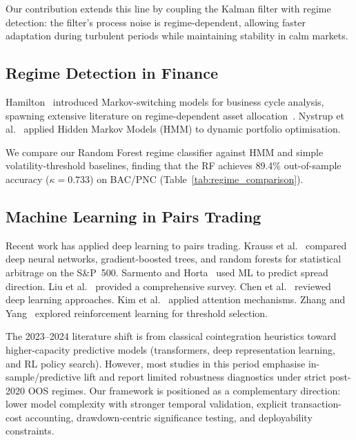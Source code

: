 \documentclass{ieeeaccess}
\begin{document}
Our contribution extends this line by coupling the Kalman filter with regime detection: the filter's process noise is regime-dependent, allowing faster adaptation during turbulent periods while maintaining stability in calm markets.

\subsection{Regime Detection in Finance}

Hamilton~\cite{hamilton1989new} introduced Markov-switching models for business cycle analysis, spawning extensive literature on regime-dependent asset allocation~\cite{ang2012regime, guidolin2011markov, bulla2011markov}.
Nystrup et al.~\cite{nystrup2017dynamic} applied Hidden Markov Models (HMM) to dynamic portfolio optimisation.

We compare our Random Forest regime classifier against HMM and simple volatility-threshold baselines, finding that the RF achieves 89.4\% out-of-sample accuracy ($\kappa = 0.733$) on BAC/PNC (Table~\ref{tab:regime_comparison}).

\subsection{Machine Learning in Pairs Trading}

Recent work has applied deep learning to pairs trading.
Krauss et al.~\cite{krauss2017deep} compared deep neural networks, gradient-boosted trees, and random forests for statistical arbitrage on the S\&P~500.
Sarmento and Horta~\cite{sarmento2020enhancing} used ML to predict spread direction.
Liu et al.~\cite{liu2023pairs} provided a comprehensive survey.
Chen et al.~\cite{chen2023deep} reviewed deep learning approaches.
Kim et al.~\cite{kim2023transformer} applied attention mechanisms.
Zhang and Yang~\cite{zhang2024reinforcement} explored reinforcement learning for threshold selection.

The 2023--2024 literature shift is from classical cointegration heuristics toward higher-capacity predictive models (transformers, deep representation learning, and RL policy search).
However, most studies in this period emphasise in-sample/predictive lift and report limited robustness diagnostics under strict post-2020 OOS regimes.
Our framework is positioned as a complementary direction: lower model complexity with stronger temporal validation, explicit transaction-cost accounting, drawdown-centric significance testing, and deployability constraints.
\end{document}
